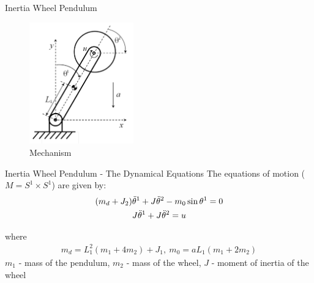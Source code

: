 \documentclass{beamer}
\begin{document}
\begin{frame}{Inertia Wheel Pendulum}
  \begin{figure}
    \centering
    \includegraphics[width=0.4\textwidth]{../Figures/inertia_wheel.png}
    \caption{Mechanism}
  \end{figure}
\end{frame}

\begin{frame}{Inertia Wheel Pendulum - The Dynamical Equations}
  The equations of motion ($M = S^1 \times S^1$) are given by:
  \begin{equation}
    \begin{split}
        (m_d + J_2) & \Ddot{\theta}^1 + J \Ddot{\theta}^2 - m_0 \sin{\theta^1} = 0\\ 
        & J \Ddot{\theta}^1 + J \Ddot{\theta}^2 = u
    \end{split}
\end{equation}

where 
\begin{equation*}
    \begin{split}
        m_d  = L_1^2(m_1 + 4 m_2) + J_1, \
        m_0  = a L_1(m_1 + 2m_2)
    \end{split}
\end{equation*}
$m_1$ - mass of the pendulum, $m_2$ - mass of the wheel, $J$ - moment of inertia of the wheel 
\end{frame}
\end{document}
